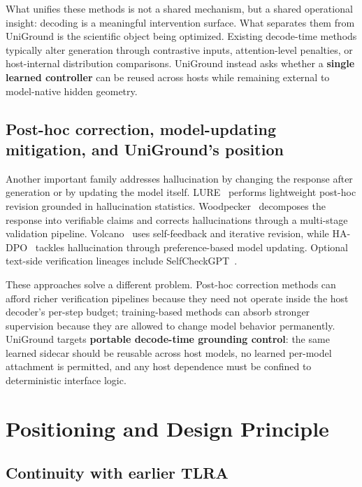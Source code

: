 What unifies these methods is not a shared mechanism, but a shared operational insight: decoding is a meaningful intervention surface. What separates them from UniGround is the scientific object being optimized. Existing decode-time methods typically alter generation through contrastive inputs, attention-level penalties, or host-internal distribution comparisons. UniGround instead asks whether a \textbf{single learned controller} can be reused across hosts while remaining external to model-native hidden geometry.

\subsection{Post-hoc correction, model-updating mitigation, and UniGround's position}

Another important family addresses hallucination by changing the response after generation or by updating the model itself. LURE~\cite{zhou2024lure} performs lightweight post-hoc revision grounded in hallucination statistics. Woodpecker~\cite{yin2023woodpecker} decomposes the response into verifiable claims and corrects hallucinations through a multi-stage validation pipeline. Volcano~\cite{lee2024volcano} uses self-feedback and iterative revision, while HA-DPO~\cite{zhao2023hadpo} tackles hallucination through preference-based model updating. Optional text-side verification lineages include SelfCheckGPT~\cite{manakul2023selfcheckgpt}.

These approaches solve a different problem. Post-hoc correction methods can afford richer verification pipelines because they need not operate inside the host decoder's per-step budget; training-based methods can absorb stronger supervision because they are allowed to change model behavior permanently. UniGround targets \textbf{portable decode-time grounding control}: the same learned sidecar should be reusable across host models, no learned per-model attachment is permitted, and any host dependence must be confined to deterministic interface logic.

\section{Positioning and Design Principle}
\label{sec:positioning}

\subsection{Continuity with earlier TLRA}

